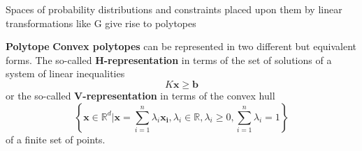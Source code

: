 \begin{frame}
Spaces of probability distributions and constraints placed upon them by linear transformations like G give rise to polytopes
\begin{block}{\textbf{Polytope}}
\textbf{Convex polytopes} can be represented in two different but equivalent forms. The so-called \textbf{H-representation} in terms of the set of solutions of a system of linear inequalities
$$K\mathbf{x} \geq \mathbf{b}$$
or the so-called \textbf{V-representation} in terms of the convex hull
$$\left\{ \mathbf{x} \in \mathbb{R}^d | \mathbf{x} = \sum_{i=1}^n \lambda_i \mathbf{x_i}, \lambda_i \in \mathbb{R}, \lambda_i \geq 0, \sum_{i=1}^n \lambda_i = 1  \right\} $$
of a finite set of points.
\end{block}
\end{frame}
